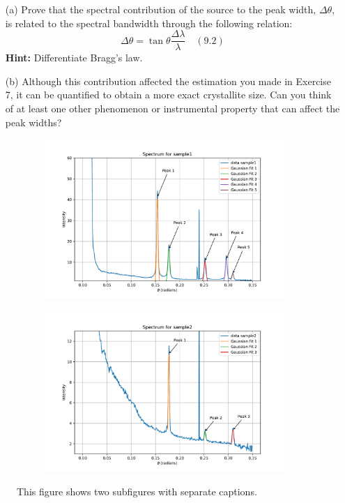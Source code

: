 \begin{enumerate}
    \item[(a)] Prove that the spectral contribution of the source to the peak width, \( \Delta \theta \), is related to the spectral bandwidth through the following relation:
    \[
    \Delta \theta = \tan \theta \frac{\Delta \lambda}{\lambda} \quad (9.2)
    \]
    \textbf{Hint:} Differentiate Bragg’s law.

    \item[(b)] Although this contribution affected the estimation you made in Exercise 7, it can be quantified to obtain a more exact crystallite size. Can you think of at least one other phenomenon or instrumental property that can affect the peak widths?
\end{enumerate}

\begin{figure}[H]
    \centering
    \begin{subfigure}[b]{0.99\textwidth} 
        \includegraphics[width=\textwidth]{Figures/gaussian_sample1.pdf}
        \label{fig:subfigure1}
    \end{subfigure}
    \begin{subfigure}[b]{0.99\textwidth} 
        \includegraphics[width=\textwidth]{Figures/gaussian_sample2.pdf}
        \label{fig:subfigure2}
    \end{subfigure}
    \caption{This figure shows two subfigures with separate captions.}
    \label{fig:result_figure}
\end{figure}

